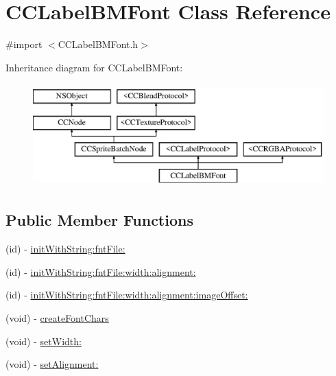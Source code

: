 \hypertarget{interface_c_c_label_b_m_font}{\section{C\-C\-Label\-B\-M\-Font Class Reference}
\label{interface_c_c_label_b_m_font}
}


{\ttfamily \#import $<$C\-C\-Label\-B\-M\-Font.\-h$>$}

Inheritance diagram for C\-C\-Label\-B\-M\-Font\-:\begin{figure}[H]
\begin{center}
\leavevmode
\includegraphics[height=3.971631cm]{interface_c_c_label_b_m_font}
\end{center}
\end{figure}
\subsection*{Public Member Functions}
\begin{DoxyCompactItemize}
\item 
(id) -\/ \hyperlink{interface_c_c_label_b_m_font_a819758f657fe3ac7042c19444047d392}{init\-With\-String\-:fnt\-File\-:}
\item 
(id) -\/ \hyperlink{interface_c_c_label_b_m_font_ae7477dfc214877d6573f5e9ff1d5ee98}{init\-With\-String\-:fnt\-File\-:width\-:alignment\-:}
\item 
(id) -\/ \hyperlink{interface_c_c_label_b_m_font_a70c5582a7a9955ce394af25da8a915f4}{init\-With\-String\-:fnt\-File\-:width\-:alignment\-:image\-Offset\-:}
\item 
(void) -\/ \hyperlink{interface_c_c_label_b_m_font_abe388c96e15b012ff97ca0491688b43a}{create\-Font\-Chars}
\item 
(void) -\/ \hyperlink{interface_c_c_label_b_m_font_a79786194311ce159ffe2c553e258f766}{set\-Width\-:}
\item 
(void) -\/ \hyperlink{interface_c_c_label_b_m_font_ab5cb0749a9ed02804a4bd5a4989c36fa}{set\-Alignment\-:}
\end{DoxyCompactItemize}
